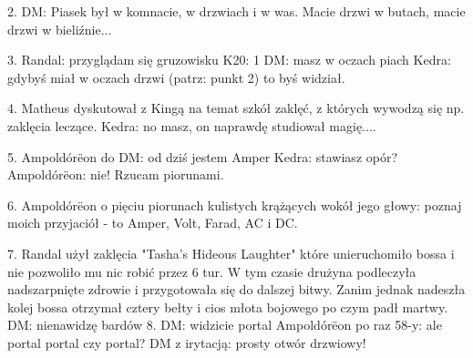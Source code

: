 \documentclass[10pt,twoside,twocolumn]{book}
\begin{document}
2. DM: Piasek był w komnacie, w drzwiach i w was. Macie drzwi w butach,  macie drzwi w bieliźnie...

3. Randal: przyglądam się gruzowisku
K20: 1
DM: masz w oczach piach
Kedra: gdybyś miał w oczach drzwi (patrz: punkt 2) to byś widział.

4.  Matheus dyskutował z Kingą na temat szkół zaklęć, z których wywodzą się np. zaklęcia leczące.
Kedra: no masz, on naprawdę studiował magię....

5. Ampoldórëon do DM: od dziś jestem Amper
Kedra: stawiasz opór?
Ampoldórëon: nie! Rzucam piorunami.

6. Ampoldórëon o pięciu piorunach kulistych krążących wokół jego głowy: poznaj moich przyjaciół - to Amper, Volt, Farad, AC i DC.

7. Randal użył zaklęcia "Tasha's Hideous Laughter" które unieruchomiło bossa i nie pozwoliło mu nic robić przez 6 tur. W tym czasie drużyna podleczyła nadszarpnięte zdrowie i przygotowała się do dalszej bitwy. Zanim jednak nadeszła kolej bossa otrzymał cztery bełty i cios młota bojowego po czym padł martwy.
DM: nienawidzę bardów
8. DM: widzicie portal
Ampoldórëon po raz 58-y: ale portal portal czy portal?
DM z irytacją: prosty otwór drzwiowy!
\end{document}
